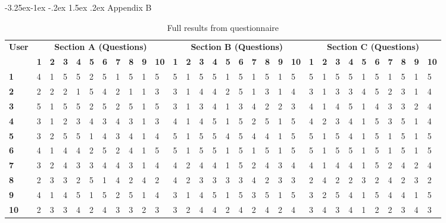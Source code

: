 \documentclass[12pt]{article}
\makeatletter
\renewcommand{\subsection}{\@startsection{subsection}{2}{\z@}%
             {-3.25ex\@plus -1ex \@minus -.2ex}%
             {1.5ex \@plus .2ex}%
             {\normalfont\large\scshape\bfseries}}
\makeatother
\begin{document}
\vspace*{-1.25cm}\subsection{Appendix B}

\begin{table}[!ht]
\centering
\hspace*{-2.5cm}\begin{tabular}{ |l|l|l|l|l|l|l|l|l|l|l|l|l|l|l|l|l|l|l|l|l|l|l|l|l|l|l|l|l|l|l| }
 	\hline
	\multirow{2}{*}{\textbf{User}} & \multicolumn{10}{|c|}{\textbf{Section A (Questions)}} & \multicolumn{10}{|c|}{\textbf{Section B (Questions)}} & \multicolumn{10}{|c|}{\textbf{Section C (Questions)}} \\
	 & \textbf{1} & \textbf{2} & \textbf{3} & \textbf{4} & \textbf{5} & \textbf{6} & \textbf{7} & \textbf{8} & \textbf{9} & \textbf{10} & \textbf{1} & \textbf{2} & \textbf{3} & \textbf{4} & \textbf{5} & \textbf{6} & \textbf{7} & \textbf{8} & \textbf{9} & \textbf{10} & \textbf{1} & \textbf{2} & \textbf{3} & \textbf{4} & \textbf{5} & \textbf{6} & \textbf{7} & \textbf{8} & \textbf{9} & \textbf{10} \\
	\hline
	\textbf{1} & 4 & 1 & 5 & 5 & 2 & 5 & 1 & 5 & 1 & 5 & 5 & 1 & 5 & 5 & 1 & 5 & 1 & 5 & 1 & 5 & 5 & 1 & 5 & 5 & 1 & 5 & 1 & 5 & 1 & 5 \\
	\hline
	\textbf{2} & 2 & 2 & 2 & 1 & 5 & 4 & 2 & 1 & 1 & 3 & 3 & 1 & 4 & 4 & 2 & 5 & 1 & 3 & 1 & 4 & 3 & 1 & 3 & 3 & 4 & 5 & 2 & 3 & 1 & 4 \\
	\hline
	\textbf{3} & 5 & 1 & 5 & 5 & 2 & 5 & 2 & 5 & 1 & 5 & 3 & 1 & 3 & 4 & 1 & 3 & 4 & 2 & 2 & 3 & 4 & 1 & 4 & 5 & 1 & 4 & 3 & 3 & 2 & 4 \\
	\hline
	\textbf{4} & 3 & 1 & 2 & 3 & 4 & 3 & 4 & 3 & 1 & 3 & 4 & 1 & 4 & 5 & 1 & 5 & 2 & 5 & 1 & 5 & 4 & 2 & 3 & 4 & 1 & 5 & 3 & 5 & 1 & 4 \\
	\hline
	\textbf{5} & 3 & 2 & 5 & 5 & 1 & 4 & 3 & 4 & 1 & 4 & 5 & 1 & 5 & 5 & 4 & 5 & 4 & 4 & 1 & 5 & 5 & 1 & 5 & 4 & 1 & 5 & 1 & 5 & 1 & 5 \\
	\hline
	\textbf{6} & 4 & 1 & 4 & 4 & 2 & 5 & 2 & 4 & 1 & 5 & 5 & 1 & 5 & 5 & 1 & 5 & 1 & 5 & 1 & 5 & 5 & 1 & 5 & 5 & 1 & 5 & 1 & 5 & 1 & 5 \\
	\hline
	\textbf{7} & 3 & 2 & 4 & 3 & 3 & 4 & 4 & 3 & 1 & 4 & 4 & 2 & 4 & 4 & 1 & 5 & 2 & 4 & 3 & 4 & 4 & 1 & 4 & 4 & 1 & 5 & 2 & 4 & 2 & 4 \\
	\hline
	\textbf{8} & 2 & 3 & 3 & 2 & 5 & 1 & 4 & 2 & 4 & 2 & 4 & 2 & 3 & 3 & 3 & 3 & 4 & 2 & 3 & 3 & 2 & 4 & 2 & 2 & 3 & 2 & 4 & 2 & 3 & 2 \\
	\hline
	\textbf{9} & 4 & 1 & 4 & 5 & 1 & 5 & 2 & 5 & 1 & 4 & 3 & 1 & 4 & 5 & 1 & 5 & 3 & 5 & 1 & 5 & 3 & 2 & 5 & 4 & 1 & 5 & 4 & 4 & 1 & 5 \\
	\hline
	\textbf{10} & 2 & 3 & 3 & 4 & 2 & 4 & 3 & 3 & 2 & 3 & 3 & 2 & 4 & 4 & 2 & 4 & 2 & 4 & 2 & 4 & 3 & 4 & 3 & 4 & 1 & 2 & 2 & 3 & 4 & 3 \\
	\hline
\end{tabular}
\caption{Full results from questionnaire}
\end{table}
\end{document}
